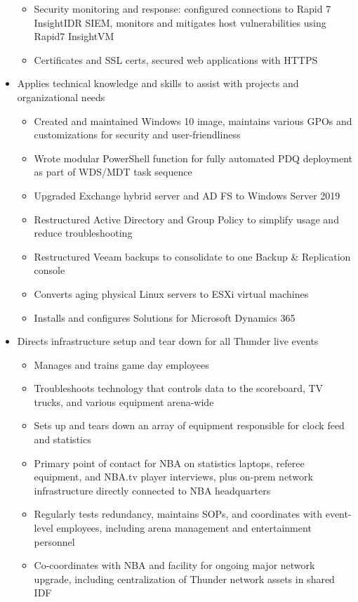 \documentclass[line]{res}
\begin{document}
\begin{resume}
\begin{itemize}
\begin{itemize}
			\item Security monitoring and response: configured connections to Rapid 7 InsightIDR SIEM, monitors and mitigates host vulnerabilities using Rapid7 InsightVM
			\item Certificates and SSL certs, secured web applications with HTTPS
		\end{itemize}
	\item Applies technical knowledge and skills to assist with projects and organizational needs		
		\begin{itemize}
			\item Created and maintained Windows 10 image, maintains various GPOs and customizations for security and user-friendliness
			\item Wrote modular PowerShell function for fully automated PDQ deployment as part of WDS/MDT task sequence
			\item Upgraded Exchange hybrid server and AD FS to Windows Server 2019
			\item Restructured Active Directory and Group Policy to simplify usage and reduce troubleshooting
			\item Restructured Veeam backups to consolidate to one Backup \& Replication console
			\item Converts aging physical Linux servers to ESXi virtual machines
			\item Installs and configures Solutions for Microsoft Dynamics 365	
		\end{itemize}
	\item Directs infrastructure setup and tear down for all Thunder live events
		\begin{itemize}
			\item Manages and trains game day employees
			\item Troubleshoots technology that controls data to the scoreboard, TV trucks, and various equipment arena-wide
			\item Sets up and tears down an array of equipment responsible for clock feed and statistics
			\item Primary point of contact for NBA on statistics laptops, referee equipment, and NBA.tv player interviews, plus on-prem network infrastructure directly connected to NBA headquarters 
			\item Regularly tests redundancy, maintains SOPs, and coordinates with event-level employees, including arena management and entertainment personnel
			\item Co-coordinates with NBA and facility for ongoing major network upgrade, including centralization of Thunder network assets in shared IDF 

\end{itemize}
\end{itemize}
\end{resume}
\end{document}
